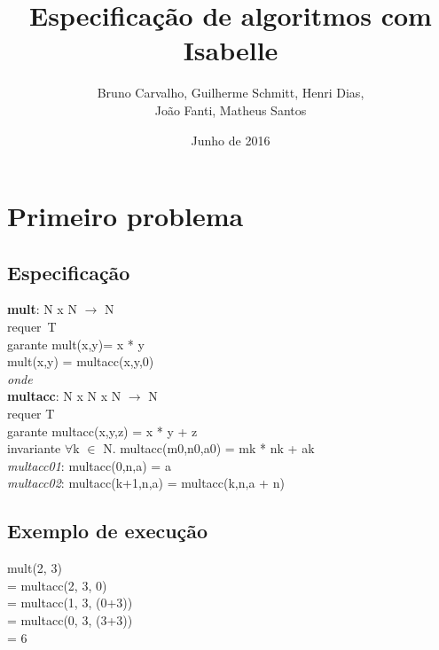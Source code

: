 \documentclass{article}
\title{Especificação de algoritmos com Isabelle}
\author {Bruno Carvalho, Guilherme Schmitt, Henri Dias,
\\João Fanti, Matheus Santos}
\date{Junho de 2016}
\begin{document}
\maketitle

\section{Primeiro problema}
\subsection{Especificação}
\textbf{mult}: N x N $\rightarrow$ N
\\requer~T
\\garante mult(x,y)= x * y
\\mult(x,y) = multacc(x,y,0)
\\\textit{onde}
\\
\textbf{multacc}: N x N x N $\rightarrow$ N
\\requer T
\\garante multacc(x,y,z) = x * y + z
\\invariante $\forall$k $\in$ N.  multacc(m0,n0,a0) = mk * nk + ak
\\\textit{multacc01}: multacc(0,n,a) = a
\\\textit{multacc02}: multacc(k+1,n,a) = multacc(k,n,a + n)

\subsection{Exemplo de execução}
mult(2, 3)
\\= multacc(2, 3, 0)
\\= multacc(1, 3, (0+3))
\\= multacc(0, 3, (3+3))
\\= 6
\end{document}
